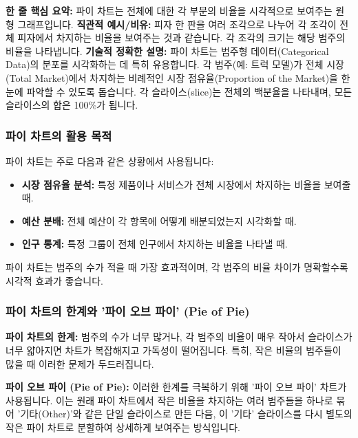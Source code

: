 \documentclass[11pt,a4paper]{article}
\theoremstyle{definition}
\begin{document}
\begin{conceptbox}
\textbf{한 줄 핵심 요약:} 파이 차트는 전체에 대한 각 부분의 비율을 시각적으로 보여주는 원형 그래프입니다.
\textbf{직관적 예시/비유:} 피자 한 판을 여러 조각으로 나누어 각 조각이 전체 피자에서 차지하는 비율을 보여주는 것과 같습니다. 각 조각의 크기는 해당 범주의 비율을 나타냅니다.
\textbf{기술적 정확한 설명:} 파이 차트는 범주형 데이터(Categorical Data)의 분포를 시각화하는 데 특히 유용합니다. 각 범주(예: 트럭 모델)가 전체 시장(Total Market)에서 차지하는 비례적인 시장 점유율(Proportion of the Market)을 한눈에 파악할 수 있도록 돕습니다. 각 슬라이스(slice)는 전체의 백분율을 나타내며, 모든 슬라이스의 합은 100\%가 됩니다.
\end{conceptbox}

\subsubsection{파이 차트의 활용 목적}
파이 차트는 주로 다음과 같은 상황에서 사용됩니다:
\begin{itemize}
    \item \textbf{시장 점유율 분석:} 특정 제품이나 서비스가 전체 시장에서 차지하는 비율을 보여줄 때.
    \item \textbf{예산 분배:} 전체 예산이 각 항목에 어떻게 배분되었는지 시각화할 때.
    \item \textbf{인구 통계:} 특정 그룹이 전체 인구에서 차지하는 비율을 나타낼 때.
\end{itemize}
파이 차트는 범주의 수가 적을 때 가장 효과적이며, 각 범주의 비율 차이가 명확할수록 시각적 효과가 좋습니다.

\subsubsection{파이 차트의 한계와 '파이 오브 파이' (Pie of Pie)}
\begin{warningbox}
\textbf{파이 차트의 한계:} 범주의 수가 너무 많거나, 각 범주의 비율이 매우 작아서 슬라이스가 너무 얇아지면 차트가 복잡해지고 가독성이 떨어집니다. 특히, 작은 비율의 범주들이 많을 때 이러한 문제가 두드러집니다.
\end{warningbox}

\begin{conceptbox}
\textbf{파이 오브 파이 (Pie of Pie):} 이러한 한계를 극복하기 위해 '파이 오브 파이' 차트가 사용됩니다. 이는 원래 파이 차트에서 작은 비율을 차지하는 여러 범주들을 하나로 묶어 '기타(Other)'와 같은 단일 슬라이스로 만든 다음, 이 '기타' 슬라이스를 다시 별도의 작은 파이 차트로 분할하여 상세하게 보여주는 방식입니다.
\end{conceptbox}
\end{document}
